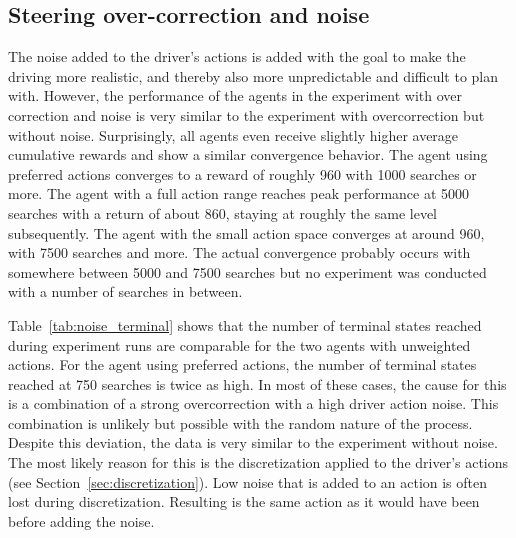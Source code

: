 
\subsection{Steering over-correction and noise}

The noise added to the driver's actions is added with the goal to make the driving more realistic, and thereby also more unpredictable and difficult to plan with. However, the performance of the agents in the experiment with over correction and noise is very similar to the experiment with overcorrection but without noise. Surprisingly, all agents even receive slightly higher average cumulative rewards and show a similar convergence behavior. The agent using preferred actions converges to a reward of roughly 960 with 1000 searches or more. The agent with a full action range reaches peak performance at 5000 searches with a return of about 860, staying at roughly the same level subsequently. The agent with the small action space converges at around 960, with 7500 searches and more. The actual convergence probably occurs with somewhere between 5000 and 7500 searches but no experiment was conducted with a number of searches in between.





Table~\ref{tab:noise_terminal} shows that the number of terminal states reached during experiment runs are comparable for the two agents with unweighted actions. For the agent using preferred actions, the number of terminal states reached at 750 searches is twice as high. In most of these cases, the cause for this is a combination of a strong overcorrection with a high driver action noise. This combination is unlikely but possible with the random nature of the process. Despite this deviation, the data is very similar to the experiment without noise. The most likely reason for this is the discretization applied to the driver's actions (see Section~\ref{sec:discretization}). Low noise that is added to an action is often lost during discretization. Resulting is the same action as it would have been before adding the noise.


